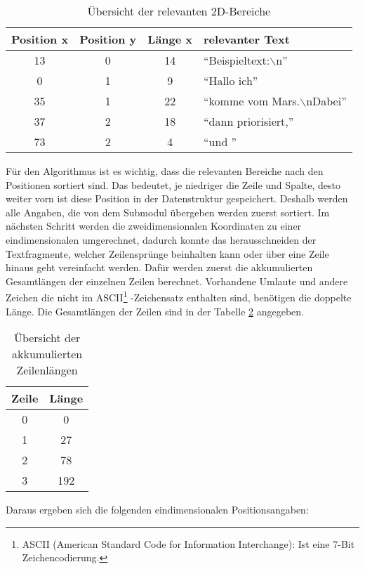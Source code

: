 \begin{longtable}{|cccl|}
\caption{Übersicht der relevanten 2D-Bereiche} \\
\hline
\label{tab:UebersichtDerRelevantenBereiche}
\textbf{Position x} & \textbf{Position y} & \textbf{Länge x} &
\textbf{relevanter Text}\\
\hline
  13 &  0 & 14 & "`Beispieltext:\ensuremath{\backslash}n"' \\
   0 &  1 &  9 & "`Hallo ich"' \\
  35 &  1 & 22 & "`komme vom Mars.\ensuremath{\backslash}nDabei"' \\
  37 &  2 & 18 & "`dann priorisiert,"' \\
  73 &  2 &  4 & "`und "' \\
\hline
\end{longtable}

Für den Algorithmus ist es wichtig, dass die relevanten Bereiche nach den
Positionen sortiert sind. Das bedeutet, je niedriger die Zeile und Spalte,
desto weiter vorn ist diese Position in der Datenstruktur gespeichert.
Deshalb werden alle Angaben, die von dem Submodul  übergeben werden 
zuerst sortiert.
Im nächsten Schritt werden die zweidimensionalen Koordinaten zu einer
eindimensionalen umgerechnet, dadurch konnte das herausschneiden der
Textfragmente, welcher Zeilensprünge beinhalten kann oder über eine Zeile hinaus
geht vereinfacht werden. Dafür
werden zuerst die akkumulierten Gesamtlängen der einzelnen Zeilen berechnet.
Vorhandene Umlaute und andere Zeichen die nicht im ASCII\footnote{ASCII
(American Standard Code for Information Interchange): Ist eine 7-Bit Zeichencodierung.}
-Zeichensatz enthalten sind, benötigen die doppelte Länge.
Die Gesamtlängen der Zeilen sind in der Tabelle
\ref{tab:UebersichtDerAkkumuliertenZeilenlaengen} angegeben.

\begin{longtable}{|cc|}
\caption{Übersicht der akkumulierten Zeilenlängen} \\
\hline
\label{tab:UebersichtDerAkkumuliertenZeilenlaengen}
\textbf{Zeile} & \textbf{Länge}\\
\hline
  0 &    0 \\
  1 &   27 \\
  2 &   78 \\
  3 &  192 \\
\hline
\end{longtable}

Daraus ergeben sich die folgenden eindimensionalen Positionsangaben:

